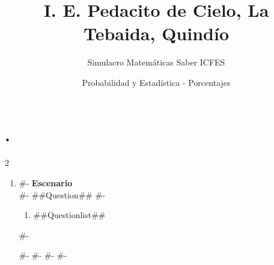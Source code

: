 \documentclass[12pt]{article}
\title{I. E. Pedacito de Cielo, La Tebaida, Quindío}
\author{Simulacro Matemáticas Saber ICFES}
\date{Probabilidad y Estadística - Porcentajes}
\begin{document}
\maketitle

\section*{.}

\begin{multicols}{2}

\begin{enumerate}[label=\arabic*.]
#-
  \item
#-
  \textbf{Escenario}\\
#-
  ##Question##
#-
  \begin{enumerate}[label=(\alph*)]
    \item ##Questionlist##
  \end{enumerate}
#-

#-
#-
#-
#-
\end{enumerate}

\end{multicols}
\end{document}
